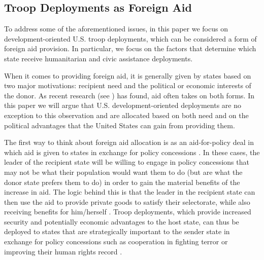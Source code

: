 \documentclass[12pt]{article}
\begin{document}
\begin{doublespace}
\section{Troop Deployments as Foreign Aid}

To address some of the aforementioned issues, in this paper we focus on development-oriented U.S. troop deployments, which can be considered a form  of foreign aid provision. In particular, we focus on the factors that determine which state receive humanitarian and civic assistance deployments. 

When it comes to providing foreign aid, it is generally given by states based on two major motivations: recipient need and the political or economic interests of the donor.  As recent research (see ) has found, aid often takes on both forms.  In this paper we will argue that U.S. development-oriented deployments are no exception to this observation and are allocated based on both need and on the political advantages that the United States can gain from providing them.

The first way to think about foreign aid allocation is as an aid-for-policy deal in which aid is given to states in exchange for policy concessions \cite{AlesinaDollar2000,palmer2011theory,BuenodeMesquita2005,de2007foreign}.  In these cases, the leader of the recipient state will be willing to engage in policy concessions that may not be what their population would want them to do (but are what the donor state prefers them to do) in order to gain the material benefits of the increase in aid.  The logic behind this is that the leader in the recipient state can then use the aid to provide private goods to satisfy their selectorate, while also receiving benefits for him/herself \cite{BuenodeMesquita2005,de2007foreign}.  Troop deployments, which provide increased security and potentially economic advantages to the host state, can thus be deployed to states that are strategically important to the sender state in exchange for policy concessions such as cooperation in fighting terror or improving their human rights record \cite{bell2015troops}.  


\end{doublespace}
\end{document}
